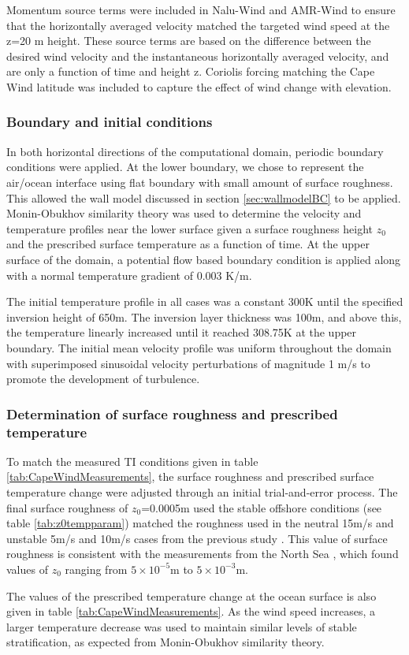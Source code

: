 Momentum source terms were included in Nalu-Wind and AMR-Wind to
ensure that the horizontally averaged velocity matched the targeted
wind speed at the z=20 m height.  These source terms are based on the
difference between the desired wind velocity and the instantaneous
horizontally averaged velocity, and are only a function of time and
height z.  Coriolis forcing matching the Cape Wind latitude was
included to capture the effect of wind change with elevation.

\subsubsection{Boundary and initial conditions}
In both horizontal directions of the computational domain, periodic
boundary conditions were applied.  At the lower boundary, we chose to
represent the air/ocean interface using flat boundary with small
amount of surface roughness.  This allowed the wall model discussed in
section \ref{sec:wallmodelBC} to be applied.  Monin-Obukhov similarity
theory was used to determine the velocity and temperature profiles
near the lower surface given a surface roughness height $z_0$ and the
prescribed surface temperature as a function of time.  At the upper
surface of the domain, a potential flow based boundary condition is
applied along with a normal temperature gradient of 0.003 K/m.

The initial temperature profile in all cases was a constant 300K until
the specified inversion height of 650m.  The inversion layer thickness
was 100m, and above this, the temperature linearly increased until it
reached 308.75K at the upper boundary.  The initial mean velocity
profile was uniform throughout the domain with superimposed sinusoidal
velocity perturbations of magnitude 1 m/s to promote the development
of turbulence.

\subsubsection{Determination of surface roughness and prescribed temperature }
To match the measured TI conditions given in table
\ref{tab:CapeWindMeasurements}, the surface roughness and prescribed
surface temperature change were adjusted through an initial
trial-and-error process.  The final surface roughness of $z_0$=0.0005m
used the stable offshore conditions (see table \ref{tab:z0tempparam})
matched the roughness used in the neutral 15m/s and unstable 5m/s and
10m/s cases from the previous study \cite{cheung2020large}.  This
value of surface roughness is consistent with the measurements from
the North Sea \cite{taylor2001dependence}, which found values of $z_0$
ranging from $5 \times 10^{-5}$m to $5\times 10^{-3}$m.

The values of the prescribed temperature change at the ocean surface
is also given in table \ref{tab:CapeWindMeasurements}.  As the wind
speed increases, a larger temperature decrease was used to maintain
similar levels of stable stratification, as expected from
Monin-Obukhov similarity theory.
